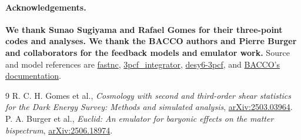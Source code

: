 \documentclass[11pt]{article}
\newcommand{\us}{\_\allowbreak}
\begin{document}
\paragraph{Acknowledgements.}
\textbf{We thank Sunao Sugiyama and Rafael Gomes for their three-point codes
and analyses. We thank the BACCO authors and Pierre Burger and collaborators
for the feedback models and emulator work.} Source and model references are
\href{https://github.com/git-sunao/fastnc}{fastnc},
\href{https://github.com/rchgomes/3pcf_integrator}{3pcf\us integrator},
\href{https://github.com/rchgomes/desy6-3pcf}{desy6-3pcf}, and
\href{https://baccoemu.readthedocs.io/}{BACCO's documentation}.

\begin{thebibliography}{9}
 R. C. H. Gomes et al., \emph{Cosmology with second and third-order
shear statistics for the Dark Energy Survey: Methods and simulated analysis},
\href{https://arxiv.org/abs/2503.03964}{arXiv:2503.03964}.
 P. A. Burger et al., \emph{Euclid: An emulator for baryonic
effects on the matter bispectrum},
\href{https://arxiv.org/abs/2506.18974}{arXiv:2506.18974}.
\end{thebibliography}
\end{document}
